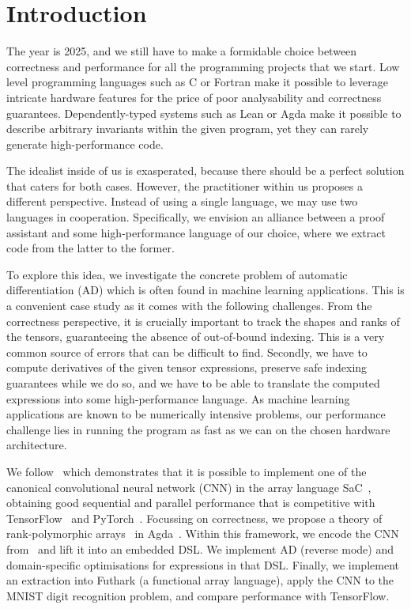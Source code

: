 \section{Introduction\label{sec:intro}}

The year is 2025, and we still have to make a formidable choice between
correctness and performance for all the programming projects that we start.
Low level programming languages such as C or Fortran make it possible to leverage
intricate hardware features for the price of poor analysability and
correctness guarantees.  Dependently-typed systems such as Lean or Agda make it possible
to describe arbitrary invariants within the given program, yet they can
rarely generate high-performance code.

The idealist inside of us is exasperated, because there should be a
perfect solution that caters for both cases. However, the practitioner
within us proposes a different perspective. Instead of using a single
language, we may use two languages in cooperation. Specifically, we
envision an alliance between a proof assistant and some
high-performance language of our choice, where we extract code from
the latter to the former.

To explore this idea, we investigate the concrete problem of automatic differentiation (AD) which
is often found in machine learning applications.  This is a convenient case study
as it comes with the following challenges.  From the correctness perspective,
it is crucially important to track the shapes and ranks of the tensors,
guaranteeing the absence of out-of-bound indexing.
This is a very common source of errors that can be difficult
to find.   Secondly, we have to compute derivatives of the given tensor expressions,
preserve safe indexing guarantees while we do so, and we have to be able to translate
the computed expressions into some high-performance language.
As machine learning applications
are known to be numerically intensive problems, our performance challenge lies
in running the program as fast as we can on the chosen hardware architecture.

We follow~\cite{cnn-array} which demonstrates that it is possible to implement
one of the canonical convolutional neural network (CNN) in the array
language SaC~\cite{sac1, sac2}, obtaining good sequential and parallel performance
that is competitive with TensorFlow~\cite{ad-tf} and PyTorch~\cite{ad-pytorch}.
Focussing on correctness, we propose
a theory of rank-polymorphic arrays~\cite{rank-poly} in Agda~\cite{agda-2-6-3}.
Within this framework, we encode the CNN from~\cite{cnn-array} and lift it 
into an embedded DSL.  We implement AD
(reverse mode) and domain-specific optimisations for expressions in that DSL.
Finally, we implement an extraction 
into Futhark (a functional array language), apply the CNN to the MNIST digit recognition problem,
and compare performance with TensorFlow.

